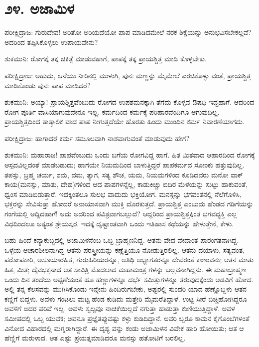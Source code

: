 
\chapter{೨೪. ಅಜಾಮಿಳ}

ಪರೀಕ್ಷಿದ್ರಾಜ: ಗುರುದೇವ! ಅರಿತೋ ಅರಿಯದೆಯೋ ಪಾಪ ಮಾಡಿದಮೇಲೆ ನರಕ ಶಿಕ್ಷೆಯನ್ನು ಅನುಭವಿಸಬೇಕಲ್ಲವೆ? ಅದರಿಂದ ತಪ್ಪಿಸಿಕೊಳ್ಳಲು ಉಪಾಯವೇನು?

ಶುಕಮುನಿ: ರೋಗಕ್ಕೆ ತಕ್ಕ ಚಿಕಿತ್ಸೆ ಮಾಡುವಹಾಗೆ, ಪಾಪಕ್ಕೆ ತಕ್ಕ ಪ್ರಾಯಶ್ಚಿತ್ತ ಮಾಡಿ ಕೊಳ್ಳಬೇಕು.

ಪರೀಕ್ಷಿದ್ರಾಜ: ಅಹುದು, ಆನೆಯು ನೀರಿನಲ್ಲಿ ಮುಳುಗಿ, ಪುನಃ ಮಣ್ಣನ್ನು ಮೈಮೇಲೆ ಎರಚಿಕೊಳ್ಳು ವಂತೆ, ಪ್ರಾಯಶ್ಚಿತ್ತ ಮಾಡಿಕೊಂಡು ಪುನಃ ಪಾಪ ಮಾಡಿದರೆ?

ಶುಕಮುನಿ: ಅಯ್ಯಾ! ಪ್ರಾಯಶ್ಚಿತ್ತವೆಂಬುದು ರೋಗದ ಉಪಶಮನಕ್ಕಾಗಿ ತೆಗೆದು ಕೊಳ್ಳವ ಔಷಧಿ ಇದ್ದಹಾಗೆ. ಆದರಿಂದ ರೋಗ ಪೂರ್ತಿ ವಾಸಿಯಾಗುವುದೇನೂ ಇಲ್ಲ. ಕರ್ಮದಿಂದ ಕರ್ಮಕ್ಕೆ ಪರಿಹಾರವೆಂದಿಗೂ ಆಗುವುದಿಲ್ಲ. ಪ್ರಾಯಶ್ಚಿತ್ತದಿಂದ ತಾತ್ಕಾಲಿಕ ವಾದ ಪಾಪ ನೀಗುತ್ತದೆಯೇ ಹೊರತು ಹಿಂದು ಮುಂದಿನ ಕರ್ಮ ನಿವಾರಣೆಯಾಗದು.

ಪರೀಕ್ಷಿದ್ರಾಜ: ಹಾಗಾದರೆ ಕರ್ಮ ಸಮೂಲವಾಗಿ ನಾಶವಾಗುವಂತೆ ಮಾಡುವುದು ಹೇಗೆ?

ಶುಕಮುನಿ: ಮಹಾರಾಜ! ಪಾಪವೆಂಬುದು ಒಂದು ಬಗೆಯ ರೋಗವಿದ್ದ ಹಾಗೆ. ಹಿತ ಮಿತವಾದ ಆಹಾರದಿಂದ ರೋಗಕ್ಕೆ ಆಸ್ಪದವಿಲ್ಲದಂತೆ ಮಾಡಬಹುದು; ಹಾಗೆಯೇ ನಿಯಮದಿಂದ ಬಾಳುತ್ತಿದ್ದರೆ ಪಾಪಕರ್ಮದ ಸೋಂಕು ಹತ್ತುವುದಿಲ್ಲ. ತಪಸ್ಸು, ಬ್ರಹ್ಮ ಚರ್ಯ, ಶಮ, ದಮ, ತ್ಯಾಗ, ಸತ್ಯ ಶೌಚ, ಯಮ, ನಿಯಮಗಳಿಂದ ಕೂಡಿದವರು ಮನೋ ವಾಕ್ ಕಾಯ(ಮನಸ್ಸು, ಮಾತು, ದೇಹ)ಗಳಿಂದ ಆದ ಪಾಪಗಳನ್ನೆಲ್ಲ, ಕಾಡುಕಿಚ್ಚು ಬಿದಿರ ಮೆಳೆಯನ್ನು ಸುಟ್ಟು ಹಾಕುವಂತೆ, ಧ್ವಂಸ ಮಾಡಿಬಿಡುತ್ತಾರೆ. ಇದಕ್ಕಿಂತಲೂ ಸುಲಭ ವಾದುದು ಭಕ್ತಿಯೋಗ. ಮನಸ್ಸನ್ನು ಭಗವಂತನಲ್ಲಿ ನೆಲೆಗೊಳಿಸಿ, ಭಕ್ತರನ್ನು ಸೇವಿಸುತ್ತಾ ಹೋದರೆ ಅನಾಯಾಸವಾಗಿ ಮುಕ್ತಿ ದೊರಕುತ್ತದೆ. ಪ್ರಾಯಶ್ಚಿತ್ತ ಎಂಬುದು ಹೆಂಡದ ಗಡಿಗೆಯನ್ನು ಗಂಗೆಯಲ್ಲಿ ಅದ್ದಿದಹಾಗೆ! ಅದು ಅದರಿಂದ ಪವಿತ್ರವಾಗಬಲ್ಲುದೆ? ಆದ್ದರಿಂದ ಪ್ರಾಯಶ್ಚಿತ್ತಕ್ಕಿಂತ ಭಗವದ್ಭಕ್ತಿ ಎಲ್ಲ ವಿಧದಿಂದಲೂ ಅತ್ಯಂತ ಶ್ರೇಯಸ್ಕರ. ಇದಕ್ಕೆ ದೃಷ್ಟಾಂತವಾಗಿ ಒಂದು ಇತಿಹಾಸ ಕಥೆಯನ್ನು ಹೇಳುತ್ತೇನೆ, ಕೇಳು.

ಬಹು ಹಿಂದೆ ಕನ್ಯಾಕುಬ್ಜದಲ್ಲಿ ಅಜಾಮಿಳನೆಂಬ ಒಬ್ಬ ಬ್ರಾಹ್ಮಣನಿದ್ದ. ಆತನು ವೇದ ವೇದಾಂತ ಪಾರಂಗತನಾಗಿದ್ದ. ಒಳ್ಳೆಯ ಆಚಾರಶೀಲನಾಗಿದ್ದ ಆತನು ಪರಸ್ತ್ರೀಯನ್ನು ಕಣ್ಣೆತ್ತಿಯೂ ನೋಡುತ್ತಿರಲಿಲ್ಲ. ಆತನು ದಯಾಳು, ಸತ್ಯವಂತ, ಪರೋಪಕಾರಿ, ಅಸೂಯಾರಹಿತ, ಗುರುಹಿರಿಯರನ್ನೂ, ಅತಿಥಿ ಅಭ್ಯಾಗತರನ್ನೂ ದೇವರಂತೆ ಕಾಣುವನು; ಆತನ ಮಾತು ಹಿತ, ಮಿತ; ದೈವಭಕ್ತನಾದ ಆತ ಸಾವಿತ್ರಿ ಮೊದಲಾದ ಮಹಾಮಂತ್ರ ಗಳನ್ನು ಬಲ್ಲವನಾಗಿದ್ದನು. ಈ ಮಹಾಬ್ರಾಹ್ಮಣ ಒಂದು ದಿನ ತಂದೆಯ ಅಪ್ಪಣೆಯಂತೆ ಹೂ ಹಣ್ಣುಗಳನ್ನೂ ದರ್ಭೆ ಸಮಿತ್ತುಗಳನ್ನೂ ತರುವುದಕ್ಕೆಂದು ಅಡವಿಗೆ ಹೋದ. ಅಲ್ಲಿ ತನ್ನ ಕೆಲಸವನ್ನು ಮುಗಿಸಿಕೊಂಡು ಇನ್ನೇನು ಹಿಂದಿರುಗಬೇಕು, ಅಷ್ಟರಲ್ಲಿ ಸುಂದರಿ ಯಾದ ಹೆಣ್ಣೊಬ್ಬಳು ಆತನ ಕಣ್ಣಿಗೆ ಬಿದ್ದಳು. ಅವಳು ಗಂಟಲು ಮಟ್ಟ ಹೆಂಡ ಕುಡಿದು ಮತ್ತೇರಿ ಮೈಮರೆತಿದ್ದಾಳೆ. ಉಟ್ಟ ಸೀರೆ ಬಿಚ್ಚಿಹೋಗಿದ್ದರೂ ಅವಳಿಗೆ ಅದರ ಪರಿವೆ ಇಲ್ಲ. ಅವಳು ಸ್ವಲ್ಪವೂ ನಾಚಿಕೆಯಿಲ್ಲದೆ ನಗುತ್ತಾ ಹಾಡುತ್ತಾ ಕುಣಿಯುತ್ತಿದ್ದಾಳೆ. ಅವಳ ಸಮೀಪದಲ್ಲಿ ಒಬ್ಬ ಯುವಕ; ಅವನೂ ಪ್ರಜ್ಞೆತಪ್ಪುವಷ್ಟು ಕಳ್ಳು ಕುಡಿದಿದ್ದಾನೆ. ಅವರಿ ಬ್ಬರೂ ಕಾಮನ ಕೈಗೊಂಬೆಗಳಂತೆ ವಿನೋದ ವಿಹಾರದಲ್ಲಿ ಮಗ್ನರಾಗಿದ್ದಾರೆ. ಈ ದೃಶ್ಯ ವನ್ನು ಕಂಡು ಅಜಾಮಿಳನ ವಿವೇಕ ಹಾರಿ ಹೋಯಿತು; ಆತ ಆ ಹೆಣ್ಣಿಗೆ ಮರುಳಾದ. ಆತ ಎಷ್ಟು ಪ್ರಯತ್ನಮಾಡಿದರೂ ಮನಸ್ಸು ಹತೋಟಿಗೆ ಬರಲಿಲ್ಲ.

